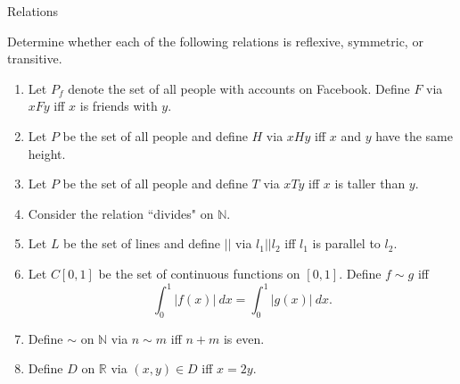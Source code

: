 \begin{section}{Relations}
\begin{exercise}
Determine whether each of the following relations is reflexive, symmetric, or transitive.

\begin{enumerate}
\item Let $P_f$ denote the set of all people with accounts on Facebook.  Define  $F$ via $xFy$ iff $x$ is friends with $y$. 
\item Let $P$ be the set of all people and define $H$ via $xHy$ iff $x$ and $y$ have the same height.
\item Let $P$ be the set of all people and define $T$ via $xTy$ iff $x$ is taller than $y$.
\item Consider the relation ``divides" on $\mathbb{N}$.
\item Let $L$ be the set of lines and define $||$ via $l_1||l_2$ iff $l_1$ is parallel to $l_2$.
\item Let $C[0,1]$ be the set of continuous functions on $[0,1]$.  Define $f\sim g$ iff
\[
\int_0^1|f(x)|\ dx=\int_0^1|g(x)|\ dx.
\]
\item Define $\sim$ on $\mathbb{N}$ via $n\sim m$ iff $n+m$ is even.
\item Define $D$ on $\mathbb{R}$ via $(x,y)\in D$ iff $x=2y$.
\end{enumerate}
\end{exercise}

\end{section}